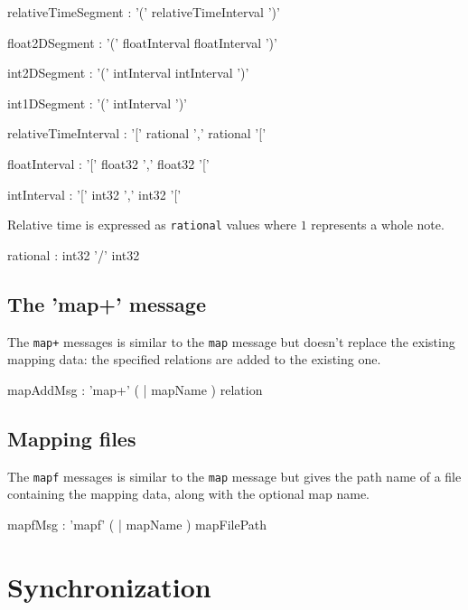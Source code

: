 \documentclass[a4paper,twoside]{report}
\newcommand{\toplevel}[1]	{\chapter{#1}}
\newcommand{\sublevel}[1]	{\section{#1}}
\newcommand{\OSC}[1]		{\texttt{#1}}
\begin{document}
\begin{rail}
relativeTimeSegment : '(' relativeTimeInterval ')' 
\end{rail}
\begin{rail}
float2DSegment : '(' floatInterval floatInterval ')' 
\end{rail}
\begin{rail}
int2DSegment : '(' intInterval intInterval ')' 
\end{rail}
\begin{rail}
int1DSegment : '(' intInterval ')' 
\end{rail}


\begin{rail}
relativeTimeInterval : '[' rational ',' rational '[' 
\end{rail}
\begin{rail}
floatInterval : '[' float32 ',' float32 '['
\end{rail}
\begin{rail}
intInterval : '[' int32 ',' int32 '['
\end{rail}

Relative time is expressed as \OSC{rational} values where $1$ represents a whole note.

\begin{rail}
rational : int32 '/' int32
\end{rail}


\sublevel{The 'map+' message}
\label{mapAddMsg}
The \OSC{map+} messages is similar to the \OSC{map} message but doesn't replace the existing mapping data: the specified relations are added to the existing one.

\begin{rail}
mapAddMsg : 'map+' ( | mapName ) relation
\end{rail}


\sublevel{Mapping files}
\label{mapFileMsg}
The \OSC{mapf} messages is similar to the \OSC{map} message but gives the path name of a file containing the mapping data, along with the optional map name.
\begin{rail}
mapfMsg : 'mapf' ( | mapName ) mapFilePath
\end{rail}



\toplevel{Synchronization}
\label{syncmsg}
\end{document}
